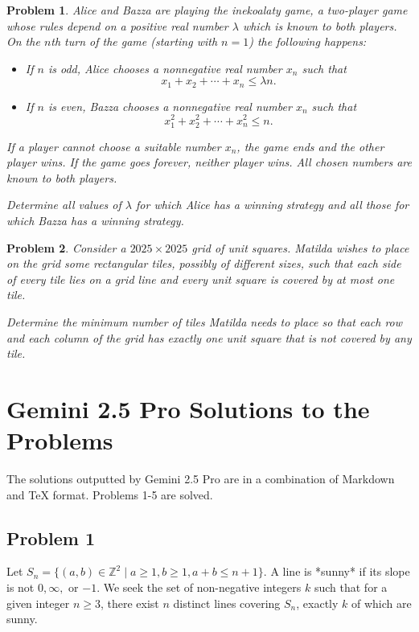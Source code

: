 \documentclass[12pt]{article}
\newtheorem{problem}{Problem}
\begin{document}
\begin{problem}
Alice and Bazza are playing the \textit{inekoalaty} game, a two-player game whose rules depend on a positive real number $\lambda$ which is known to both players. On the $n$th turn of the game (starting with $n = 1$) the following happens:
\begin{itemize}
    \item If $n$ is odd, Alice chooses a nonnegative real number $x_n$ such that
    \[
    x_1 + x_2 + \cdots + x_n \le \lambda n.
    \]
    \item If $n$ is even, Bazza chooses a nonnegative real number $x_n$ such that 
    \[
    x_1^2 + x_2^2 + \cdots + x_n^2 \le n.
    \]
\end{itemize}

If a player cannot choose a suitable number $x_n$, the game ends and the other player wins. If the game goes forever, neither player wins. All chosen numbers are known to both players.

Determine all values of $\lambda$ for which Alice has a winning strategy and all those for which Bazza has a winning strategy.
\end{problem}

\begin{problem}
Consider a $2025 \times 2025$ grid of unit squares. Matilda wishes to place on the grid some rectangular tiles, possibly of different sizes, such that each side of every tile lies on a grid line and every unit square is covered by at most one tile.

Determine the minimum number of tiles Matilda needs to place so that each row and each column of the grid has exactly one unit square that is not covered by any tile.
\end{problem}

\section{Gemini 2.5 Pro Solutions to the Problems}

The solutions outputted by Gemini 2.5 Pro are in a combination of Markdown and TeX format. Problems 1-5 are solved.

\subsection{Problem 1}

Let $S_n = \{(a,b) \in \mathbb{Z}^2 \mid a \ge 1, b \ge 1, a+b \le n+1\}$. A line is *sunny* if its slope is not $0, \infty,$ or $-1$. We seek the set of non-negative integers $k$ such that for a given integer $n \ge 3$, there exist $n$ distinct lines covering $S_n$, exactly $k$ of which are sunny.
\end{document}
